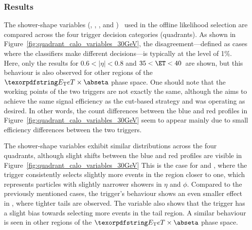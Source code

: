 \subsubsection{Results}\label{top:quadrant_results}



The shower-shape variables (\reta{}, \rphi{}, \eratio{}, and \rhad{})~\cite{TRIG-2018-05} used in the offline likelihood selection are compared across the four trigger decision categories (quadrants). As shown in Figure~\ref{fig:quadrant_calo_variables_30GeV}, the disagreement—defined as cases where the classifiers make different decisions—is typically at the level of 1\%.
Here, only the results for $0.6<|\eta|<0.8$ and $35<\ET<40$~\GeV are shown, but this behaviour is also observed for other regions of the $\eteta$ phase space. 
One should note that the working points of the two triggers are not exactly the same, although the \rnn{} aims to achieve the same signal efficiency as the cut-based strategy and was operating as desired.  In other words, the count differences between the blue and red profiles in Figure~\ref{fig:quadrant_calo_variables_30GeV} seem to appear mainly due to small efficiency differences between the two triggers.




The shower-shape variables exhibit similar distributions across the four quadrants, although slight shifts between the blue and red profiles are visible in Figure~\ref{fig:quadrant_calo_variables_30GeV}
This is the case for \reta{} and \rphi{}, where the \rnn{} trigger consistently selects slightly more events in the region closer to one, which represents particles with slightly narrower showers in $\eta{}$ and $\phi{}$. Compared to the previously mentioned cases, the \rnn{} trigger's behaviour shows an even smaller effect in \rhad{}, where tighter tails are observed.%
The \eratio{} variable also shows that the \rnn{} trigger has a slight bias towards selecting more events in the tail region. 
A similar behaviour is seen in other regions of the $\eteta$ phase space.


